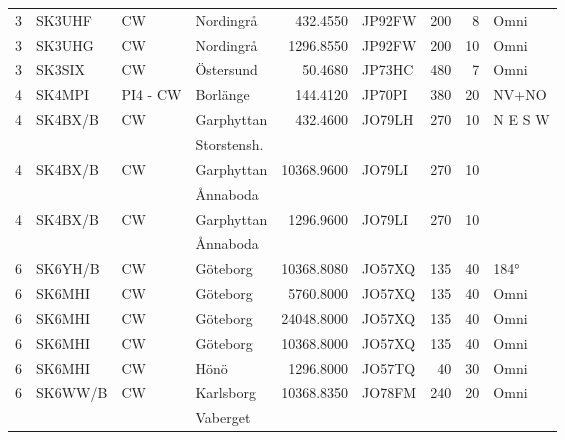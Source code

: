 \begin{longtable}{rlllrlrrl}
	       3 & SK3UHF     & CW       & Nordingrå    &     432.4550 & JP92FW      &      200 &        8 & Omni         \\
	       3 & SK3UHG     & CW       & Nordingrå    &    1296.8550 & JP92FW      &      200 &       10 & Omni         \\
	       3 & SK3SIX     & CW       & Östersund    &      50.4680 & JP73HC      &      480 &        7 & Omni         \\
	       4 & SK4MPI     & PI4 - CW & Borlänge     &     144.4120 & JP70PI      &      380 &       20 & NV+NO        \\
	       4 & SK4BX/B    & CW       & Garphyttan   &     432.4600 & JO79LH      &      270 &       10 & N E S W      \\
	         &            &          & Storstensh.  &              &             &          &          &              \\
	       4 & SK4BX/B    & CW       & Garphyttan   &   10368.9600 & JO79LI      &      270 &       10 &              \\
	         &            &          & Ånnaboda     &              &             &          &          &              \\
	       4 & SK4BX/B    & CW       & Garphyttan   &    1296.9600 & JO79LI      &      270 &       10 &              \\
	         &            &          & Ånnaboda     &              &             &          &          &              \\
	       6 & SK6YH/B    & CW       & Göteborg     &   10368.8080 & JO57XQ      &      135 &       40 & 184°         \\
	       6 & SK6MHI     & CW       & Göteborg     &    5760.8000 & JO57XQ      &      135 &       40 & Omni         \\
	       6 & SK6MHI     & CW       & Göteborg     &   24048.8000 & JO57XQ      &      135 &       40 & Omni         \\
	       6 & SK6MHI     & CW       & Göteborg     &   10368.8000 & JO57XQ      &      135 &       40 & Omni         \\
	       6 & SK6MHI     & CW       & Hönö         &    1296.8000 & JO57TQ      &       40 &       30 & Omni         \\
	       6 & SK6WW/B    & CW       & Karlsborg    &   10368.8350 & JO78FM      &      240 &       20 & Omni         \\
	         &            &          & Vaberget     &              &             &          &          &              \\

\end{longtable}

